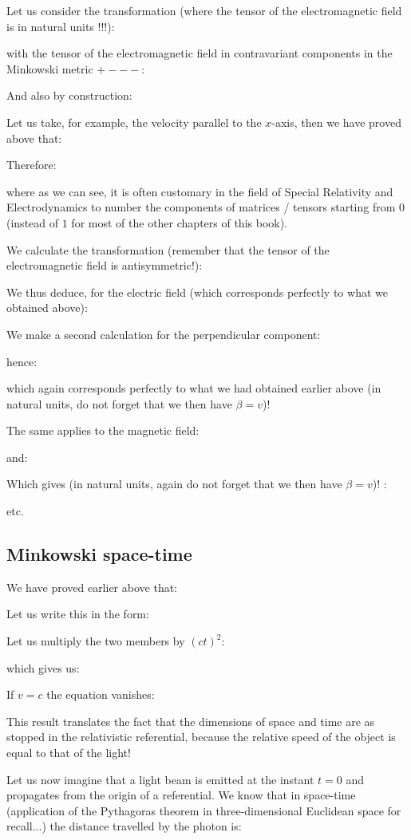 	Let us consider the transformation (where the tensor of the electromagnetic field is in natural units !!!):
	
	with the tensor of the electromagnetic field in contravariant components in the Minkowski metric $+---$:
	
	And also by construction:
	
	Let us take, for example, the velocity parallel to the $x$-axis, then we have proved above that:
	
	Therefore:
	
	where as we can see, it is often customary in the field of Special Relativity and Electrodynamics to number the components of matrices / tensors starting from $0$ (instead of $1$ for most of the other chapters of this book).

	We calculate the transformation (remember that the tensor of the electromagnetic field is antisymmetric!):
	
	We thus deduce, for the electric field (which corresponds perfectly to what we obtained above):
	
	We make a second calculation for the perpendicular component:
	
	hence:
	
	which again corresponds perfectly to what we had obtained earlier above (in natural units, do not forget that we then have $\beta=v$)!

	The same applies to the magnetic field:
	
	and:
	
	Which gives (in natural units, again do not forget that we then have $\beta=v$)! :
	
	etc.
	
	\subsection{Minkowski space-time}
		We have proved earlier above that:
	
	Let us write this in the form:
	
	Let us multiply the two members by $(ct)^2$:
	
	which gives us:
	
	If $v=c$ the equation vanishes:
	
	This result translates the fact that the dimensions of space and time are as stopped in the relativistic referential, because the relative speed of the object is equal to that of the light!

	Let us now imagine that a light beam is emitted at the instant $t=0$ and propagates from the origin of a referential. We know that in space-time (application of the Pythagoras theorem in three-dimensional Euclidean space for recall...) the distance travelled by the photon is:
	
